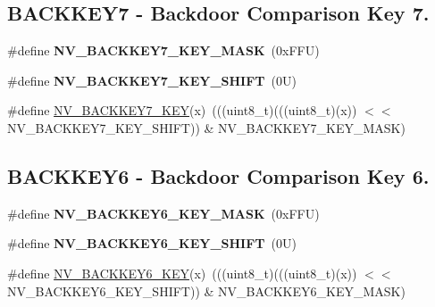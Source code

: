 \subsection*{B\+A\+C\+K\+K\+E\+Y7 -\/ Backdoor Comparison Key 7.}
\begin{DoxyCompactItemize}
\item 
\mbox{\label{group___n_v___register___masks_gac3f2bc7dd55b7951d70a5d1fcb6552b8}} 
\#define {\bfseries N\+V\+\_\+\+B\+A\+C\+K\+K\+E\+Y7\+\_\+\+K\+E\+Y\+\_\+\+M\+A\+SK}~(0x\+F\+F\+U)
\item 
\mbox{\label{group___n_v___register___masks_gad6bef74e61e792dfa5b7d195e4ce5620}} 
\#define {\bfseries N\+V\+\_\+\+B\+A\+C\+K\+K\+E\+Y7\+\_\+\+K\+E\+Y\+\_\+\+S\+H\+I\+FT}~(0\+U)
\item 
\#define \mbox{\hyperlink{group___n_v___register___masks_ga2dbc4f6480af3ebaeeaf328a7f394c9f}{N\+V\+\_\+\+B\+A\+C\+K\+K\+E\+Y7\+\_\+\+K\+EY}}(x)~(((uint8\+\_\+t)(((uint8\+\_\+t)(x)) $<$$<$ N\+V\+\_\+\+B\+A\+C\+K\+K\+E\+Y7\+\_\+\+K\+E\+Y\+\_\+\+S\+H\+I\+FT)) \& N\+V\+\_\+\+B\+A\+C\+K\+K\+E\+Y7\+\_\+\+K\+E\+Y\+\_\+\+M\+A\+SK)
\end{DoxyCompactItemize}
\subsection*{B\+A\+C\+K\+K\+E\+Y6 -\/ Backdoor Comparison Key 6.}
\begin{DoxyCompactItemize}
\item 
\mbox{\label{group___n_v___register___masks_ga44e2d846ef1b9d5ad94a707fa6f29ae1}} 
\#define {\bfseries N\+V\+\_\+\+B\+A\+C\+K\+K\+E\+Y6\+\_\+\+K\+E\+Y\+\_\+\+M\+A\+SK}~(0x\+F\+F\+U)
\item 
\mbox{\label{group___n_v___register___masks_ga271a532af55987843f56d660efb5d440}} 
\#define {\bfseries N\+V\+\_\+\+B\+A\+C\+K\+K\+E\+Y6\+\_\+\+K\+E\+Y\+\_\+\+S\+H\+I\+FT}~(0\+U)
\item 
\#define \mbox{\hyperlink{group___n_v___register___masks_ga0dc772c12f13eb390c75b52f2110f0f1}{N\+V\+\_\+\+B\+A\+C\+K\+K\+E\+Y6\+\_\+\+K\+EY}}(x)~(((uint8\+\_\+t)(((uint8\+\_\+t)(x)) $<$$<$ N\+V\+\_\+\+B\+A\+C\+K\+K\+E\+Y6\+\_\+\+K\+E\+Y\+\_\+\+S\+H\+I\+FT)) \& N\+V\+\_\+\+B\+A\+C\+K\+K\+E\+Y6\+\_\+\+K\+E\+Y\+\_\+\+M\+A\+SK)
\end{DoxyCompactItemize}
